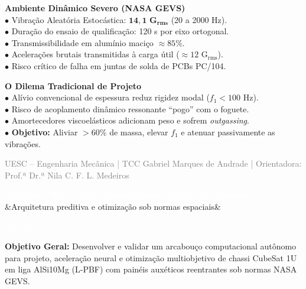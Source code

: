 \documentclass[11pt]{article}
\newcommand{\slideheader}[3]{
    \noindent
    \begin{minipage}{\textwidth}
        \colorbox{SpaceNavy}{
            \parbox{\dimexpr\textwidth-2\fboxsep\relax}{
                \vspace{0.2cm}
                \hspace{0.3cm}
                \begin{minipage}{0.85\textwidth}
                    {\Large \textbf{\textcolor{white}{#1}}}\\[0.1cm]
                    \ifx&#2&\else{\small \textbf{\textcolor{SpaceGold}{#2}}}\fi
                \end{minipage}
                \hfill
                \begin{minipage}{0.10\textwidth}
                    \raggedleft
                    {\large \textbf{\textcolor{white}{#3 / 20}}}\hspace{0.3cm}
                \end{minipage}
                \vspace{0.2cm}
            }
        }
    \end{minipage}
    \vspace{0.4cm}
}
\newcommand{\slidefooter}{
    \vfill
    \noindent
    \begin{minipage}{\textwidth}
        \centering
        \scriptsize \textcolor{gray}{UESC -- Engenharia Mecânica | TCC Gabriel Marques de Andrade | Orientadora: Prof.ª Dr.ª Nila C. F. L. Medeiros}
    \end{minipage}
}
\begin{document}
\begin{minipage}[t]{0.48\textwidth}
    \textbf{\textcolor{NavyAccent}{Ambiente Dinâmico Severo (NASA GEVS)}}\\[0.2cm]
    \small
    $\bullet$ Vibração Aleatória Estocástica: $\mathbf{14{,}1\text{ G}_{\text{rms}}}$ (20 a 2000 Hz).\\
    $\bullet$ Duração do ensaio de qualificação: 120 s por eixo ortogonal.\\
    $\bullet$ Transmissibilidade em alumínio maciço $\approx 85\%$.\\
    $\bullet$ Acelerações brutais transmitidas à carga útil ($\approx 12\text{ G}_{\text{rms}}$).\\
    $\bullet$ Risco crítico de falha em juntas de solda de PCBs PC/104.
\end{minipage}
\hfill
\begin{minipage}[t]{0.48\textwidth}
    \textbf{\textcolor{NavyAccent}{O Dilema Tradicional de Projeto}}\\[0.2cm]
    \small
    $\bullet$ Alívio convencional de espessura reduz rigidez modal ($f_1 < 100\text{ Hz}$).\\
    $\bullet$ Risco de acoplamento dinâmico ressonante ``pogo'' com o foguete.\\
    $\bullet$ Amortecedores viscoelásticos adicionam peso e sofrem \textit{outgassing}.\\
    $\bullet$ \textbf{Objetivo:} Aliviar $> 60\%$ de massa, elevar $f_1$ e atenuar passivamente as vibrações.
\end{minipage}

\slidefooter
\clearpage

\slideheader{Objetivos: Rota 100\% Computacional de Alto Desempenho}{Arquitetura preditiva e otimização sob normas espaciais}{04}

\textbf{\textcolor{NavyAccent}{Objetivo Geral:}}
Desenvolver e validar um arcabouço computacional autônomo para projeto, aceleração neural e otimização multiobjetivo de chassi CubeSat 1U em liga AlSi10Mg (L-PBF) com painéis auxéticos reentrantes sob normas NASA GEVS.
\vspace{0.4cm}
\end{document}
